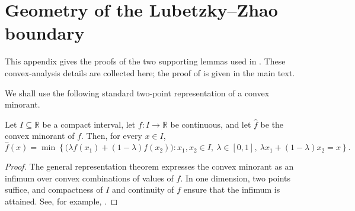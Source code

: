 \section{Geometry of the Lubetzky--Zhao boundary}
\label{app:lz-geometry}

This appendix gives the proofs of the two supporting lemmas used in
.  These convex-analysis details are collected here;
the proof of  is given in the main text.

We shall use the following standard two-point representation of a convex
minorant.

\begin{lemma}
\label{lem:two-point-convex-minorant}
Let $I\subseteq\mathbb R$ be a compact interval, let $f:I\to\mathbb R$ be
continuous, and let $\widehat f$ be the convex minorant of $f$.  Then, for
every $x\in I$,
\[
  \widehat f(x)
  =
  \min\left\{
    \Big(\lambda f(x_1)+(1-\lambda)f(x_2)\Big):
      x_1,x_2\in I,\  \lambda\in[0,1],\
      \lambda x_1+(1-\lambda)x_2=x
  \right\}.
\]
\end{lemma}
\begin{proof}
The general representation theorem expresses the convex minorant as an
infimum over convex combinations of values of $f$.  In one dimension, two
points suffice, and compactness of $I$ and continuity of $f$ ensure that the
infimum is attained.  See, for example,
\cite[Corollary~17.1.5]{RockafellarConvexAnalysis}.
\end{proof}

